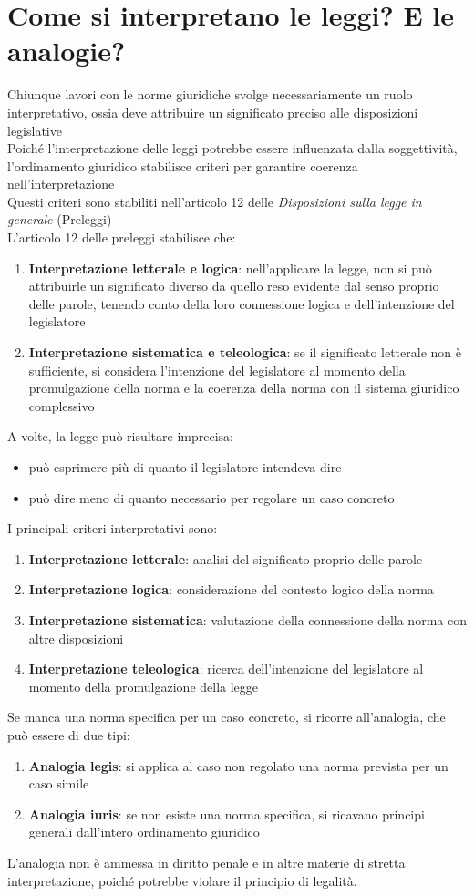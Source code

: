 \documentclass[10pt,oneside,a4paper]{article}
\begin{document}
	\section{Come si interpretano le leggi? E le analogie?}
	Chiunque lavori con le norme giuridiche svolge necessariamente un ruolo interpretativo, ossia deve attribuire un significato preciso alle disposizioni legislative\\
	Poiché l'interpretazione delle leggi potrebbe essere influenzata dalla soggettività, l'ordinamento giuridico stabilisce criteri per garantire coerenza nell'interpretazione\\
	Questi criteri sono stabiliti nell'articolo 12 delle \textit{Disposizioni sulla legge in generale} (Preleggi)\\
	L'articolo 12 delle preleggi stabilisce che:  
	\begin{enumerate}
		\item \textbf{Interpretazione letterale e logica}: nell'applicare la legge, non si può attribuirle un significato diverso da quello reso evidente dal senso proprio delle parole, tenendo conto della loro connessione logica e dell'intenzione del legislatore
		\item \textbf{Interpretazione sistematica e teleologica}: se il significato letterale non è sufficiente, si considera l'intenzione del legislatore al momento della promulgazione della norma e la coerenza della norma con il sistema giuridico complessivo
	\end{enumerate}
	A volte, la legge può risultare imprecisa:  
	\begin{itemize}
		\item può esprimere più di quanto il legislatore intendeva dire
		\item può dire meno di quanto necessario per regolare un caso concreto  
	\end{itemize}
	I principali criteri interpretativi sono:  
	\begin{enumerate}
		\item \textbf{Interpretazione letterale}: analisi del significato proprio delle parole
		\item \textbf{Interpretazione logica}: considerazione del contesto logico della norma
		\item \textbf{Interpretazione sistematica}: valutazione della connessione della norma con altre disposizioni
		\item \textbf{Interpretazione teleologica}: ricerca dell'intenzione del legislatore al momento della promulgazione della legge
	\end{enumerate}Se manca una norma specifica per un caso concreto, si ricorre all'analogia, che può essere di due tipi:  
	\begin{enumerate}
		\item \textbf{Analogia legis}: si applica al caso non regolato una norma prevista per un caso simile
		\item \textbf{Analogia iuris}: se non esiste una norma specifica, si ricavano principi generali dall'intero ordinamento giuridico
	\end{enumerate}
	L'analogia non è ammessa in diritto penale e in altre materie di stretta interpretazione, poiché potrebbe violare il principio di legalità. 
\end{document}
